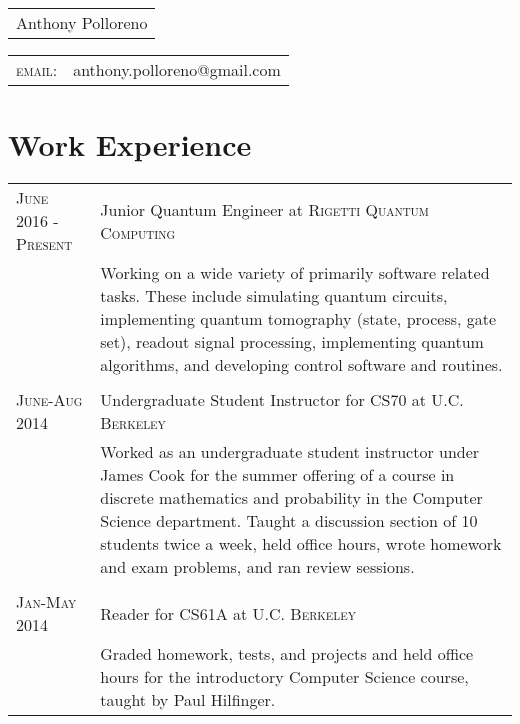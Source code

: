 \documentclass[a4paper,10pt]{article}
\begin{document}
\newcommand*{\fontin}[2]{{\setmainfont{Fontin}#1{#2}}}

\pagestyle{empty} %




\begin{tabular}{l}

{\Huge Anthony Polloreno}\\\end{tabular} \hfill
\begin{tabular}{lr}
    \fontin{\textsc}{email:}     & anthony.polloreno@gmail.com
\end{tabular}

\section{Work Experience}
\begin{tabularx}{\textwidth}{l|X}
\fontin{\textsc}{June 2016 - Present} & Junior Quantum Engineer at \fontin{\textsc}{Rigetti Quantum Computing} \\ &
\footnotesize{Working on a wide variety of primarily software related tasks. These include simulating quantum circuits, implementing quantum tomography (state, process, gate set), readout signal processing, implementing quantum algorithms, and developing control software and routines.}\\\multicolumn{2}{c}{} \\

\fontin{\textsc}{June-Aug 2014} & Undergraduate Student Instructor for CS70 at \fontin{\textsc}{U.C. Berkeley} \\&\footnotesize{Worked as an undergraduate student instructor under James Cook for the summer offering of a course in discrete mathematics and probability in the Computer Science department. Taught a discussion section of 10 students twice a week, held office hours, wrote homework and exam problems, and ran review sessions.}\\\multicolumn{2}{c}{} \\
\fontin{\textsc}{Jan-May 2014} & Reader for  CS61A at \fontin{\textsc}{U.C. Berkeley}\\&\footnotesize{Graded homework, tests, and projects and held office hours for the introductory Computer Science course, taught by Paul Hilfinger.}
\end{tabularx}
\end{document}
